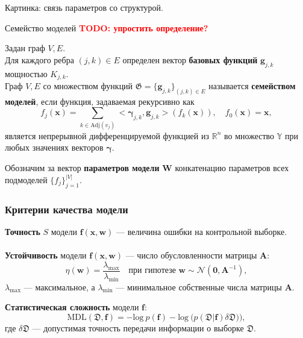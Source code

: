 \documentclass[usenames,dvipsnames,11pt,pdf,utf8,russian,aspectratio=169]{beamer}
\begin{document}
\begin{frame}{}
Картинка: связь параметров со структурой.
\end{frame}

\begin{frame}{ Семейство моделей}
\textcolor{red}{\textbf{TODO: упростить определение?\\}}


Задан граф $V,E$. \\
Для каждого ребра $(j,k) \in E$ определен вектор \textbf{базовых функций} $\mathbf{g}_{j,k}$ мощностью $K_{j,k}$.\\
Граф $V, E$ со множеством функций $\mathfrak{G} = \{\mathbf{g}_{j,k}\}_{(j,k) \in E}$ называется \textbf{семейством моделей}, если функция, задаваемая рекурсивно как 
\[
    f_j(\mathbf{x}) = \sum_{k \in \text{Adj}(v_j)} <\boldsymbol{\gamma}_{j,k}, \mathbf{g}_{j,k}> (f_{k}(\mathbf{x})), \quad     f_0(\mathbf{x}) = \mathbf{x},
\]
является непрерывной дифференцируемой функцией из $\mathbb{R}^n$ во множество $\mathbb{Y}$ при любых значениях векторов $\boldsymbol{\gamma}$.

Обозначим за вектор \textbf{параметров модели}  $\mathbf{W}$ конкатенацию параметров всех подмоделей $\{f_j\}_{j=1}^{|V|}$.
\end{frame}




\begin{frame}
\frametitle{Критерии качества модели}

\textbf{Точность} $S$ модели $\mathbf{f}(\mathbf{x}, \mathbf{w})$ --- величина ошибки на контрольной выборке.
~\\
~\\
\textbf{Устойчивость} модели $\mathbf{f}(\mathbf{x}, \mathbf{w})$ --- число обусловленности матрицы $\mathbf{A}$:
$$\eta(\mathbf{{w}})=\frac{\lambda_{\max}}{\lambda_{\min}} \quad\text{при гипотезе } 	\mathbf{w} \sim \mathcal{N}(\mathbf{0},\mathbf{A}^{-1}),$$  $\lambda_{\max}$ --- максимальное, а $\lambda_{\min}$ --- минимальное собственные числа матрицы $\mathbf{A}$.




\textbf{Статистическая сложность} модели $\mathbf{f}$:
\[
	\text{MDL}(\mathfrak{D},\mathbf{f}) = -\text{log}~p(\mathbf{f}) - \text{log}~\bigl(p(\mathfrak{D}|\mathbf{f})\delta\mathfrak{D})\bigr),
\]
где $\delta\mathfrak{D}$ --- допустимая точность передачи информации о выборке $\mathfrak{D}$.


\end{frame}
\end{document}
